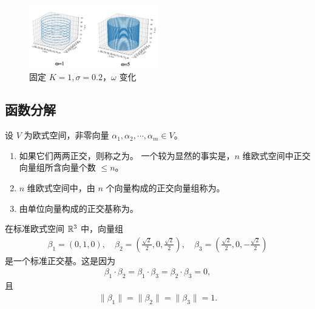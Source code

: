 \begin{property}[复指数信号与正余弦信号之间的关系]
\begin{figure}[htbp]
        \label{fig:complex-exponential-signal-sigma-vary}
    \end{figure}
    \begin{figure}[htbp]
        \centering
        \includegraphics[width=0.5\textwidth]{chap1/img/complex-exponential-signal-omega-vary.png}
        \caption{固定 $K = 1, \sigma = 0.2$，$\omega$ 变化}
        \label{fig:complex-exponential-signal-omega-vary}
    \end{figure}
\end{property}

\subsection{函数分解}

\begin{definition}[正交基]
    设 $V$ 为欧式空间，非零向量 $\alpha_1, \alpha_2, \cdots, \alpha_m \in V$。
    \begin{enumerate}
        \item 如果它们两两正交，则称之为。
            一个较为显然的事实是，$n$ 维欧式空间中正交向量组所含向量个数 $\le n$。
        \item $n$ 维欧式空间中，由 $n$ 个向量构成的正交向量组称为。
        \item 由单位向量构成的正交基称为。
    \end{enumerate}
\end{definition}

\begin{example}
    在标准欧式空间 $\mathbb{R}^3$ 中，向量组
    \begin{align*}
        \beta_1 = (0, 1, 0),
        \quad \beta_2 = (\frac{\sqrt{2}}{2}, 0, \frac{\sqrt{2}}{2}),
        \quad \beta_3 = (\frac{\sqrt{2}}{2}, 0, -\frac{\sqrt{2}}{2})
    \end{align*}
    是一个标准正交基。这是因为
    \begin{align*}
        \beta_1 \cdot \beta_2 = \beta_1 \cdot \beta_3 = \beta_2 \cdot \beta_3 = 0,
    \end{align*}
    且
    \begin{align*}
        \|\beta_1\| = \|\beta_2\| = \|\beta_3\| = 1.
    \end{align*}
\end{example}

